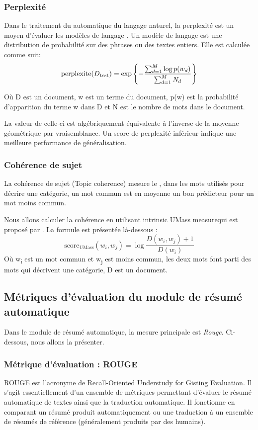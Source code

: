         \subsubsection{Perplexité}
        Dans le traitement du automatique du langage naturel, la perplexité est un moyen d'évaluer les modèles de langage \cite{perplexite}. Un modèle de langage est une distribution de probabilité sur des phrases ou des textes entiers. Elle est calculée comme suit:
        \[
        \text{perplexite}(D\textsubscript{test}) =
        \exp
        \left \{-\frac{\sum_{d=1}^{M}{\log{p(w_d)}}}{\sum_{d=1}^{M}{N_d}}\right\}
        \]

        Où D est un document, w est un terme du document, p(w) est la probabilité d'apparition du terme w dans D et N est le nombre de mots dans le document.

        La valeur de celle-ci est algébriquement équivalente à l'inverse de la moyenne géométrique par vraisemblance. Un score de perplexité inférieur indique une meilleure performance de généralisation.

        \subsubsection{Cohérence de sujet}
        La cohérence de sujet (Topic coherence) mesure le , dans les mots utilisés pour décrire une catégorie, un mot commun est en moyenne un bon prédicteur pour un mot moins commun.

        Nous allons calculer la cohérence en utilisant \textquotedbl intrinsic UMass measure\textquotedbl qui est proposé par \cite{perplexite}. La formule est présentée là-dessous :
        \[
        \text{score}_{\text{UMass}}(w_i, w_j) =
        \log
        \frac{D(w_i, w_j) + 1}{D(w_i)}
        \]
        Où w\textsubscript{i} est un mot commun et w\textsubscript{j} est moins commun, les deux mots font parti des mots qui décrivent une catégorie, D est un document.

    \subsection{Métriques d'évaluation du module de résumé automatique}
    Dans le module de résumé automatique, la mesure principale est \emph{Rouge}. Ci-dessous, nous allons la présenter.

        \subsubsection{Métrique d'évaluation : ROUGE\label{metrique-eval}}
        ROUGE est l'acronyme de \textquotedbl Recall-Oriented Understudy for Gisting Evaluation\textquotedbl. Il s'agit essentiellement d'un ensemble de métriques permettant d'évaluer le résumé automatique de textes ainsi que la traduction automatique. Il fonctionne en comparant un résumé produit automatiquement ou une traduction à un ensemble de résumés de référence (généralement produits par des humains). \cite{rouge0}


